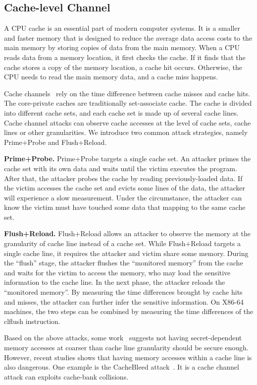 \subsection{Cache-level Channel}
A CPU cache is an essential part of modern computer systems. It is a smaller and faster memory that is designed to reduce the average data access costs to the main memory by storing copies of data from the main memory. When a CPU reads data from a memory location, it first checks the cache. If it finds that the cache stores a copy of the memory location, a cache hit occurs. Otherwise, the CPU needs to read the main memory data, and a cache miss happens.

Cache channels~\cite{yarom2017cachebleed,191010,184415,Osvik2006,liu2015last,184415} rely on the time difference between cache misses and cache hits. The core-private caches are traditionally set-associate cache. The cache is divided into different cache sets, and each cache set is made up of several cache lines. Cache channel attacks can observe cache accesses at the level of cache sets, cache lines or other granularities. We introduce two common attack strategies, namely Prime+Probe and Flush+Reload.

\textbf{Prime+Probe.} Prime+Probe targets a single cache set.
An attacker primes the cache set with its own data and waits until the victim executes the program. After that, the attacker probes the cache by reading previously-loaded data. If the victim accesses the cache set and evicts some lines of the data, the attacker will experience a slow measurement. Under the circumstance, the attacker can know the victim must have touched some data that mapping to the same cache set.

\textbf{Flush+Reload.} Flush+Reload allows an attacker to observe the memory at the granularity of cache line instead of a cache set. While Flush+Reload targets a single cache line, it requires the attacker and victim share some memory. During the ``flush'' stage, the attacker flushes the ``monitored
memory'' from the cache and waits for the victim to access the memory, who may load the sensitive information to the cache line.  In the next phase,
the attacker reloads the ``monitored memory''. By measuring the time differences
brought by cache hits and misses, the attacker can further infer the sensitive information. On X86-64 machines, the two steps can be combined by measuring the time differences of the \textsf{clflush} instruction.

Based on the above attacks, some work~\cite{brickell2011technologies} suggests not having secret-dependent memory accesses at coarser than cache line granularity should be secure enough. However, recent studies shows that having memory accesses within a cache line is also dangerous. One example is the CacheBleed attack~\cite{yarom2017cachebleed}. It is a cache channel attack can exploits cache-bank collisions.
